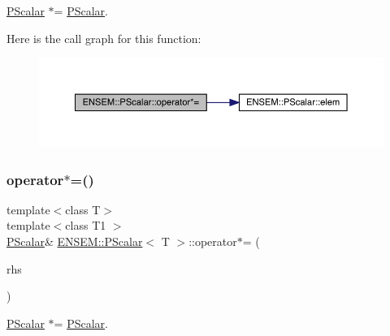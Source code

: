 \mbox{\hyperlink{classENSEM_1_1PScalar}{P\+Scalar}} $\ast$= \mbox{\hyperlink{classENSEM_1_1PScalar}{P\+Scalar}}. 

Here is the call graph for this function\+:
\nopagebreak
\begin{figure}[H]
\begin{center}
\leavevmode
\includegraphics[width=350pt]{d3/d27/classENSEM_1_1PScalar_addccfa9164f9d80554657387932185c4_cgraph}
\end{center}
\end{figure}
\mbox{\label{classENSEM_1_1PScalar_addccfa9164f9d80554657387932185c4}} 
\subsubsection{\texorpdfstring{operator$\ast$=()}{operator*=()}\hspace{0.1cm}{\footnotesize\ttfamily [2/2]}}
{\footnotesize\ttfamily template$<$class T$>$ \\
template$<$class T1 $>$ \\
\mbox{\hyperlink{classENSEM_1_1PScalar}{P\+Scalar}}\& \mbox{\hyperlink{classENSEM_1_1PScalar}{E\+N\+S\+E\+M\+::\+P\+Scalar}}$<$ T $>$\+::operator$\ast$= (\begin{DoxyParamCaption}\item[{const \mbox{\hyperlink{classENSEM_1_1PScalar}{P\+Scalar}}$<$ T1 $>$ \&}]{rhs }\end{DoxyParamCaption})\hspace{0.3cm}{\ttfamily [inline]}}



\mbox{\hyperlink{classENSEM_1_1PScalar}{P\+Scalar}} $\ast$= \mbox{\hyperlink{classENSEM_1_1PScalar}{P\+Scalar}}. 

